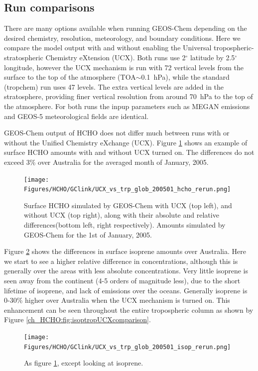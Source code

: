   \subsection{Run comparisons}
    
    There are many options available when running GEOS-Chem depending on the desired chemistry, resolution, meteorology, and boundary conditions.
    Here we compare the model output with and without enabling the Universal tropospheric-stratospheric Chemistry eXtension (UCX).
    Both runs use 2$^{\circ}$ latitude by 2.5$^{\circ}$ longitude, however the UCX mechanism is run with 72 vertical levels from the surface to the top of the atmosphere (TOA$\sim$0.1~hPa), while the standard (tropchem) run uses 47 levels.
    The extra vertical levels are added in the stratosphere, providing finer vertical resolution from around 70~hPa to the top of the atmosphere.
    For both runs the inpup parameters such as MEGAN emissions and GEOS-5 meteorological fields are identical.
    
    GEOS-Chem output of HCHO does not differ much between runs with or without the Unified Chemistry eXchange (UCX).
    Figure \ref{Model:GC_Running:UCXvsTrop_HCHO} shows an example of surface HCHO amounts with and without UCX turned on.
    The differences do not exceed 3\% over Australia for the averaged month of January, 2005.
    
    \begin{figure}%
      \texttt{[image: Figures/HCHO/GClink/UCX\_vs\_trp\_glob\_200501\_hcho\_rerun.png]}
      \caption{ %
        Surface HCHO simulated by GEOS-Chem with UCX (top left), and without UCX (top right), along with their absolute and relative differences(bottom left, right respectively).
        Amounts simulated by GEOS-Chem for the 1st of January, 2005.
      }
      \label{Model:GC_Running:UCXvsTrop_HCHO}
    \end{figure}
    
    Figure \ref{Model:GC_Running:UCXvsTrop_Isop} shows the differences in surface isoprene amounts over Australia.
    Here we start to see a higher relative difference in concentrations, although this is generally over the areas with less absolute concentrations. 
    Very little isoprene is seen away from the continent (4-5 orders of magnitude less), due to the short lifetime of isoprene, and lack of emissions over the oceans.
    Generally isoprene is 0-30\% higher over Australia when the UCX mechanism is turned on.
    This enhancement can be seen throughout the entire tropospheric column as shown by Figure \ref{ch_HCHO:fig:isoptropUCXcomparison}.
    \begin{figure}%
      \texttt{[image: Figures/HCHO/GClink/UCX\_vs\_trp\_glob\_200501\_isop\_rerun.png]}
      \caption{ %
        As figure \ref{Model:GC_Running:UCXvsTrop_HCHO}, except looking at isoprene. 
      }      
      \label{Model:GC_Running:UCXvsTrop_Isop}
    \end{figure}
    
